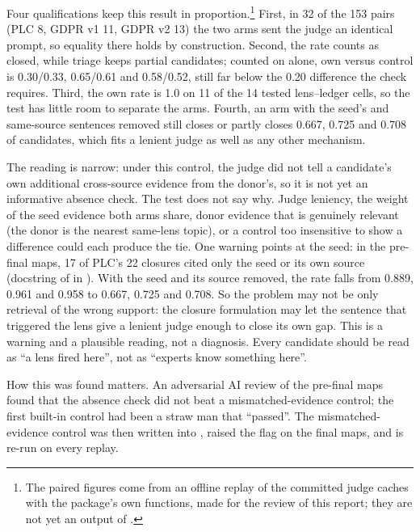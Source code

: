 Four qualifications keep this result in proportion.\footnote{The paired figures come from an
offline replay of the committed judge caches with the package's own functions, made for the review of
this report; they are not yet an output of .} First, in 32 of the
153 pairs (PLC 8, GDPR v1 11, GDPR v2 13) the two arms sent the judge an identical prompt, so equality
there holds by construction. Second, the rate counts  as closed, while triage keeps
partial candidates; counted on  alone, own versus control is 0.30/0.33, 0.65/0.61 and
0.58/0.52, still far below the 0.20 difference the check requires. Third, the own rate is 1.0 on 11
of the 14 tested lens--ledger cells, so the test has little room to separate the arms. Fourth, an arm
with the seed's and same-source sentences removed still closes or partly closes 0.667, 0.725 and
0.708 of candidates, which fits a lenient judge as well as any other mechanism.

\evint{} The reading is narrow: under this control, the judge did not tell a candidate's own
additional cross-source evidence from the donor's, so it is not yet an informative absence check. The
test does not say why. Judge leniency, the weight of the seed evidence both arms share, donor evidence
that is genuinely relevant (the donor is the nearest same-lens topic), or a control too insensitive to
show a difference could each produce the tie. \evobs{} One warning points at the seed: in the pre-final
maps, 17 of PLC's 22 closures cited only the seed or its own source (docstring of
 in ). With the seed and its source
removed, the rate falls from 0.889, 0.961 and 0.958 to 0.667, 0.725 and 0.708. \evint{} So the problem
may not be only retrieval of the wrong support: the closure formulation may let the sentence that
triggered the lens give a lenient judge enough to close its own gap. This is a warning and a plausible
reading, not a diagnosis. Every candidate should be read as \enquote{a lens
fired here}, not as \enquote{experts know something here}.

\evobs{} How this was found matters. An adversarial AI review of the pre-final maps found that the
absence check did not beat a mismatched-evidence control; the first built-in control had been a straw man that
\enquote{passed}. The mismatched-evidence control was then written into , raised
the  flag on the final maps, and is re-run on every replay.

